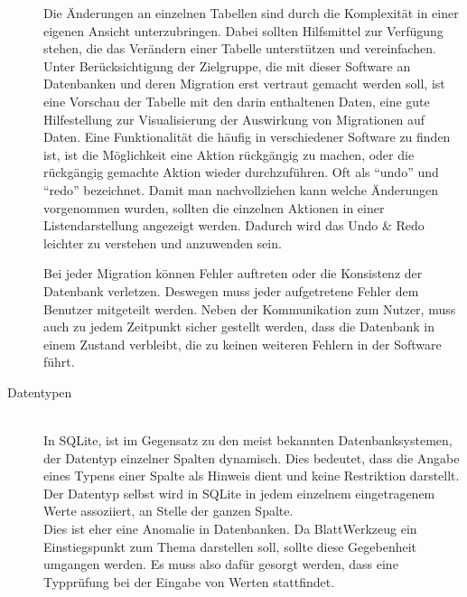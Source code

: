 \begin{description}
Die Änderungen an einzelnen Tabellen sind durch die Komplexität in einer eigenen Ansicht unterzubringen. Dabei sollten Hilfsmittel zur Verfügung stehen, die das Verändern einer Tabelle unterstützen und vereinfachen.
Unter Berücksichtigung der Zielgruppe, die mit dieser Software an Datenbanken und deren Migration erst vertraut gemacht werden soll, ist eine Vorschau der Tabelle mit den darin enthaltenen Daten, eine gute Hilfestellung zur Visualisierung der Auswirkung von Migrationen auf Daten.
Eine Funktionalität die häufig in verschiedener Software zu finden ist, ist die Möglichkeit eine Aktion rückgängig zu machen, oder die rückgängig gemachte Aktion wieder durchzuführen. Oft als ``undo'' und ``redo'' bezeichnet. Damit man nachvollziehen kann welche Änderungen vorgenommen wurden, sollten die einzelnen Aktionen in einer Listendarstellung angezeigt werden. Dadurch wird das Undo \& Redo leichter zu verstehen und anzuwenden sein.

Bei jeder Migration können Fehler auftreten oder die Konsistenz der Datenbank verletzen. Deswegen muss jeder aufgetretene Fehler dem Benutzer mitgeteilt werden. Neben der Kommunikation zum Nutzer, muss auch zu jedem Zeitpunkt sicher gestellt werden, dass die Datenbank in einem Zustand verbleibt, die zu keinen weiteren Fehlern in der Software führt.

\item[Datentypen] \label{subsubsec03:zu_entwickeln-Datentypen} \hfill\\
In SQLite, ist im Gegensatz zu den meist bekannten Datenbanksystemen, der Datentyp einzelner Spalten dynamisch. Dies bedeutet, dass die Angabe eines Typens einer Spalte als Hinweis dient und keine Restriktion darstellt. Der Datentyp selbst wird in SQLite in jedem einzelnem eingetragenem Werte assoziiert, an Stelle der ganzen Spalte. \\
Dies ist eher eine Anomalie in Datenbanken. Da BlattWerkzeug ein Einstiegspunkt zum Thema darstellen soll, sollte diese Gegebenheit umgangen werden. Es muss also dafür gesorgt werden, dass eine Typprüfung bei der Eingabe von Werten stattfindet. 

\end{description}
